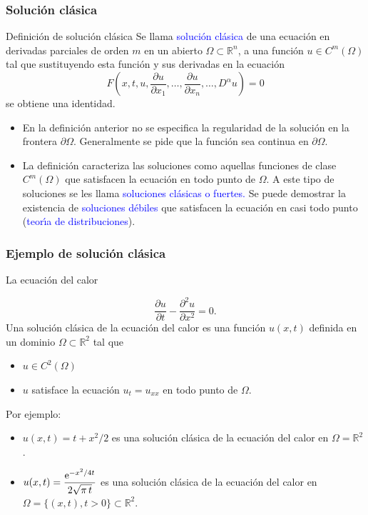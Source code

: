 \documentclass[compress]{beamer}
\def\R{\mathbb{R}}
\begin{document}
\begin{frame}
\frametitle{Soluci\'on cl\'asica}
\small
\vspace{-0.1cm}
\begin{block}{Definici\'on de soluci\'{o}n cl\'{a}sica}{
Se llama \textcolor{blue}{soluci\'on cl\'asica} de una ecuaci\'on en derivadas parciales de orden $m$
en un abierto $\Omega \subset \R^n$, a una funci\'on $u \in C^m(\Omega)$ tal que sustituyendo esta funci\'on
y sus derivadas en la ecuaci\'on
\[
F(x,t,u,\frac{\partial u}{\partial x_1},\ldots,\frac{\partial u}{\partial x_n}, \ldots, D^{\alpha} u) = 0
\]
se obtiene una identidad.
}
\end{block}
\vspace{-0.1cm}
\begin{itemize}
\item En la definici\'on anterior no se especifica la \textcolor{azul}{regularidad de la soluci\'on en la frontera $\partial \Omega$}. Generalmente se pide que la funci\'on sea continua en  $\partial \Omega$.
\item La definici\'on caracteriza las soluciones como aquellas funciones de clase $C^m(\Omega)$ que satisfacen la ecuaci\'on en todo punto de $\Omega$. A este tipo de soluciones se les llama \textcolor{blue}{soluciones cl\'asicas o fuertes.} Se puede demostrar la existencia de \textcolor{blue}{soluciones d\'ebiles} que satisfacen la ecuaci\'on en casi todo punto (\textcolor{blue}{teor\'{\i}a de distribuciones}).
\end{itemize}
\end{frame}


\begin{frame}
\frametitle{Ejemplo de soluci\'on cl\'asica}
\small
\begin{block}{La ecuaci\'on del calor}{
\[
\frac{\partial u}{\partial t} - \frac{\partial^2 u}{\partial x^2}  = 0.
\]
Una soluci\'on cl\'asica de la ecuaci\'on del calor es una funci\'on $u(x,t)$ definida en un dominio $\Omega \subset \R^2$
tal que
\begin{itemize}
\item $u\in C^2(\Omega)$
\item $u$ satisface la ecuaci\'on $u_t=u_{xx}$ en todo punto de $\Omega.$
\end{itemize}}
\end{block}
\vspace{0.2cm}
Por ejemplo:
\begin{itemize}
\item $u(x,t) = t + x^2/2$ es una soluci\'on cl\'asica de la ecuaci\'on del calor en $\Omega=\R^2$.
\item $\displaystyle u(x,t) = \frac{{\rm e}^{-x^2/4t}}{2 \sqrt{\pi \, t}}$ es una soluci\'on cl\'asica de la ecuaci\'on del calor en
$\Omega = \{(x,t), t>0\} \subset \R^2$.
\end{itemize}
\end{frame}
\end{document}
